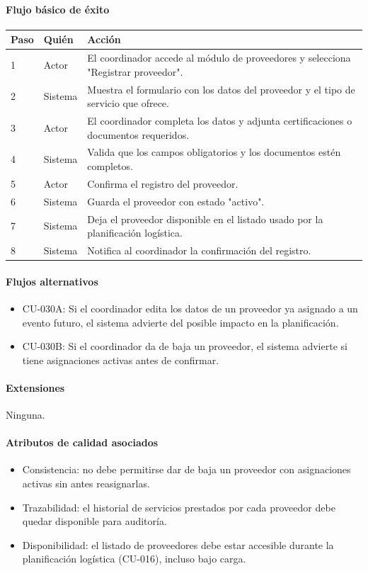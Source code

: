 \paragraph{Flujo básico de éxito}
\begin{longtable}{P{1.1cm}P{1.8cm}P{10.5cm}}
\toprule
\textbf{Paso} & \textbf{Quién} & \textbf{Acción}\\
\midrule
{} & Actor & El coordinador accede al módulo de proveedores y selecciona "Registrar proveedor".\\
2 & Sistema & Muestra el formulario con los datos del proveedor y el tipo de servicio que ofrece.\\
3 & Actor & El coordinador completa los datos y adjunta certificaciones o documentos requeridos.\\
4 & Sistema & Valida que los campos obligatorios y los documentos estén completos.\\
5 & Actor & Confirma el registro del proveedor.\\
6 & Sistema & Guarda el proveedor con estado "activo".\\
7 & Sistema & Deja el proveedor disponible en el listado usado por la planificación logística.\\
8 & Sistema & Notifica al coordinador la confirmación del registro.\\
\bottomrule
\end{longtable}

\paragraph{Flujos alternativos}
\begin{itemize}[leftmargin=1.4em, topsep=1pt]
  \item CU-030A: Si el coordinador edita los datos de un proveedor ya asignado a un evento futuro, el sistema advierte del posible impacto en la planificación.
  \item CU-030B: Si el coordinador da de baja un proveedor, el sistema advierte si tiene asignaciones activas antes de confirmar.
\end{itemize}

\paragraph{Extensiones}
Ninguna.

\paragraph{Atributos de calidad asociados}
\begin{itemize}[leftmargin=1.4em, topsep=1pt]
  \item Consistencia: no debe permitirse dar de baja un proveedor con asignaciones activas sin antes reasignarlas.
  \item Trazabilidad: el historial de servicios prestados por cada proveedor debe quedar disponible para auditoría.
  \item Disponibilidad: el listado de proveedores debe estar accesible durante la planificación logística (CU-016), incluso bajo carga.
\end{itemize}

